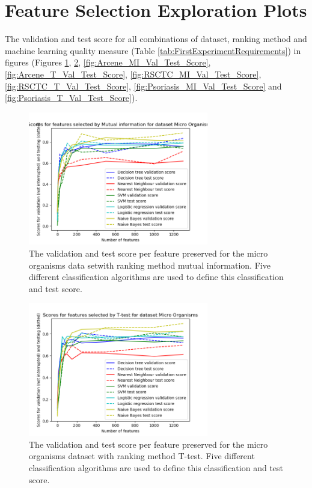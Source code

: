 \documentclass[10pt,a4paper]{article}
\begin{document}
	
	 
	
	
	\appendix
	
	\section{Feature Selection Exploration Plots}
	\label{app:FeatureSelectionExplorationPlots}
	
	The validation and test score for all combinations of dataset, ranking method and machine learning quality measure (Table \ref{tab:FirstExperimentRequirements}) in figures (Figures \ref{fig:MO_MI_Val_Test_Score}, \ref{fig:MO_T_Val_Test_Score}, \ref{fig:Arcene_MI_Val_Test_Score}, \ref{fig:Arcene_T_Val_Test_Score}, \ref{fig:RSCTC_MI_Val_Test_Score}, \ref{fig:RSCTC_T_Val_Test_Score}, \ref{fig:Psoriasis_MI_Val_Test_Score} and \ref{fig:Psoriasis_T_Val_Test_Score}). 
	
	\begin{figure}[H]
		\includegraphics[width=0.7\textwidth]{MO_MI_Val_Test_Score.png}
		\caption{The validation and test score per feature preserved for the micro organisms data setwith ranking method mutual information. Five different classification algorithms are used to define this classification and test score.}
		\label{fig:MO_MI_Val_Test_Score}
	\end{figure}
	
	\begin{figure}[H]
		\includegraphics[width=0.7\textwidth]{MO_T_Val_Test_Score.png}
		\caption{The validation and test score per feature preserved for the micro organisms dataset with ranking method T-test. Five different classification algorithms are used to define this classification and test score.}
		\label{fig:MO_T_Val_Test_Score}
	\end{figure}
\end{document}
